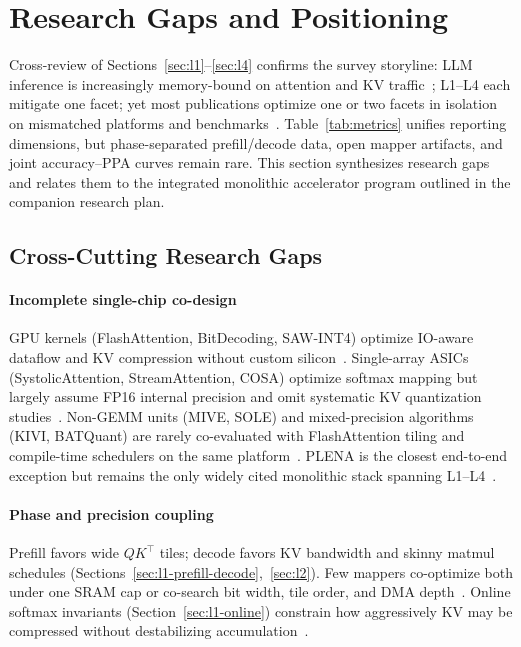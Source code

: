 \documentclass[conference]{IEEEtran}
\begin{document}
\section{Research Gaps and Positioning}
\label{sec:gaps}

Cross-review of Sections~\ref{sec:l1}--\ref{sec:l4} confirms the survey storyline: LLM inference is increasingly memory-bound on attention and KV traffic~\cite{dao2023flashdecoding,bitdecoding2026,sawint42026}; L1--L4 each mitigate one facet; yet most publications optimize one or two facets in isolation on mismatched platforms and benchmarks~\cite{lin2025systolicattention,liu2024kivi,mive2026,plena2025,sawint42026}.
Table~\ref{tab:metrics} unifies reporting dimensions, but phase-separated prefill/decode data, open mapper artifacts, and joint accuracy--PPA curves remain rare.
This section synthesizes research gaps and relates them to the integrated monolithic accelerator program outlined in the companion research plan.

\subsection{Cross-Cutting Research Gaps}
\label{sec:gaps-synthesis}

\paragraph{Incomplete single-chip co-design}
GPU kernels (FlashAttention, BitDecoding, SAW-INT4) optimize IO-aware dataflow and KV compression without custom silicon~\cite{dao2022flashattention,bitdecoding2026,sawint42026}.
Single-array ASICs (SystolicAttention, StreamAttention, COSA) optimize softmax mapping but largely assume FP16 internal precision and omit systematic KV quantization studies~\cite{lin2025systolicattention,streamattention2025,wang2023cosa}.
Non-GEMM units (MIVE, SOLE) and mixed-precision algorithms (KIVI, BATQuant) are rarely co-evaluated with FlashAttention tiling and compile-time schedulers on the same platform~\cite{mive2026,sole2025,liu2024kivi,batquant2026,plena2025}.
PLENA is the closest end-to-end exception but remains the only widely cited monolithic stack spanning L1--L4~\cite{plena2025}.

\paragraph{Phase and precision coupling}
Prefill favors wide $QK^\top$ tiles; decode favors KV bandwidth and skinny matmul schedules (Sections~\ref{sec:l1-prefill-decode},~\ref{sec:l2}).
Few mappers co-optimize both under one SRAM cap or co-search bit width, tile order, and DMA depth~\cite{plena2025,flatattention2026,dao2023flashdecoding,batquant2026}.
Online softmax invariants (Section~\ref{sec:l1-online}) constrain how aggressively KV may be compressed without destabilizing accumulation~\cite{liu2024kivi,guaranteednorm2026}.
\end{document}
